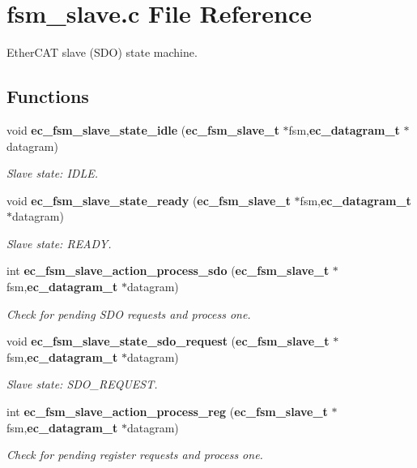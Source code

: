 \section{fsm\-\_\-slave.\-c \-File \-Reference}
\label{fsm__slave_8c}


\-Ether\-C\-A\-T slave (\-S\-D\-O) state machine.  


\subsection*{\-Functions}
\begin{DoxyCompactItemize}
\item 
void {\bf ec\-\_\-fsm\-\_\-slave\-\_\-state\-\_\-idle} ({\bf ec\-\_\-fsm\-\_\-slave\-\_\-t} $\ast$fsm,{\bf ec\-\_\-datagram\-\_\-t} $\ast$datagram)
\begin{DoxyCompactList}\small\item\em \-Slave state\-: \-I\-D\-L\-E. \end{DoxyCompactList}\item 
void {\bf ec\-\_\-fsm\-\_\-slave\-\_\-state\-\_\-ready} ({\bf ec\-\_\-fsm\-\_\-slave\-\_\-t} $\ast$fsm,{\bf ec\-\_\-datagram\-\_\-t} $\ast$datagram)
\begin{DoxyCompactList}\small\item\em \-Slave state\-: \-R\-E\-A\-D\-Y. \end{DoxyCompactList}\item 
int {\bf ec\-\_\-fsm\-\_\-slave\-\_\-action\-\_\-process\-\_\-sdo} ({\bf ec\-\_\-fsm\-\_\-slave\-\_\-t} $\ast$fsm,{\bf ec\-\_\-datagram\-\_\-t} $\ast$datagram)
\begin{DoxyCompactList}\small\item\em \-Check for pending \-S\-D\-O requests and process one. \end{DoxyCompactList}\item 
void {\bf ec\-\_\-fsm\-\_\-slave\-\_\-state\-\_\-sdo\-\_\-request} ({\bf ec\-\_\-fsm\-\_\-slave\-\_\-t} $\ast$fsm,{\bf ec\-\_\-datagram\-\_\-t} $\ast$datagram)
\begin{DoxyCompactList}\small\item\em \-Slave state\-: \-S\-D\-O\-\_\-\-R\-E\-Q\-U\-E\-S\-T. \end{DoxyCompactList}\item 
int {\bf ec\-\_\-fsm\-\_\-slave\-\_\-action\-\_\-process\-\_\-reg} ({\bf ec\-\_\-fsm\-\_\-slave\-\_\-t} $\ast$fsm,{\bf ec\-\_\-datagram\-\_\-t} $\ast$datagram)
\begin{DoxyCompactList}\small\item\em \-Check for pending register requests and process one. \end{DoxyCompactList}\item 

\end{DoxyCompactItemize}
